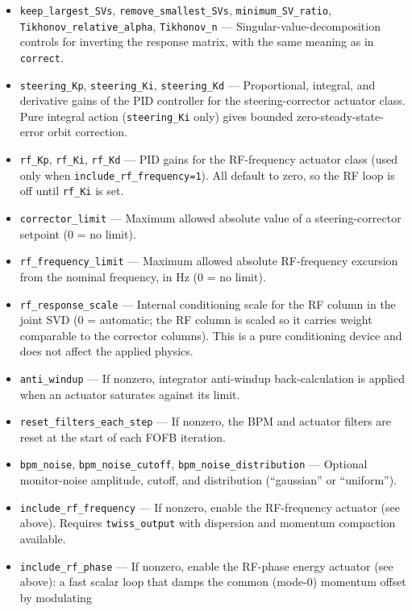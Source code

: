\documentclass[11pt]{article}
\begin{document}
\begin{itemize}
  \verb|correct|.  They are ignored when the default analytic response matrix is used.
\item \verb|keep_largest_SVs|, \verb|remove_smallest_SVs|, \verb|minimum_SV_ratio|,
  \verb|Tikhonov_relative_alpha|, \verb|Tikhonov_n| --- Singular-value-decomposition
  controls for inverting the response matrix, with the same meaning as in \verb|correct|.
\item \verb|steering_Kp|, \verb|steering_Ki|, \verb|steering_Kd| --- Proportional,
  integral, and derivative gains of the PID controller for the steering-corrector
  actuator class.  Pure integral action (\verb|steering_Ki| only) gives bounded
  zero-steady-state-error orbit correction.
\item \verb|rf_Kp|, \verb|rf_Ki|, \verb|rf_Kd| --- PID gains for the RF-frequency actuator
  class (used only when \verb|include_rf_frequency=1|).  All default to zero, so the RF
  loop is off until \verb|rf_Ki| is set.
\item \verb|corrector_limit| --- Maximum allowed absolute value of a steering-corrector
  setpoint (0 = no limit).
\item \verb|rf_frequency_limit| --- Maximum allowed absolute RF-frequency excursion from
  the nominal frequency, in Hz (0 = no limit).
\item \verb|rf_response_scale| --- Internal conditioning scale for the RF column in the
  joint SVD (0 = automatic; the RF column is scaled so it carries weight comparable to the
  corrector columns).  This is a pure conditioning device and does not affect the applied
  physics.
\item \verb|anti_windup| --- If nonzero, integrator anti-windup back-calculation is
  applied when an actuator saturates against its limit.
\item \verb|reset_filters_each_step| --- If nonzero, the BPM and actuator filters are
  reset at the start of each FOFB iteration.
\item \verb|bpm_noise|, \verb|bpm_noise_cutoff|, \verb|bpm_noise_distribution| --- Optional
  monitor-noise amplitude, cutoff, and distribution (``gaussian'' or ``uniform'').
\item \verb|include_rf_frequency| --- If nonzero, enable the RF-frequency actuator (see
  above).  Requires \verb|twiss_output| with dispersion and momentum compaction available.
\item \verb|include_rf_phase| --- If nonzero, enable the RF-phase energy actuator (see
  above): a fast scalar loop that damps the common (mode-0) momentum offset by modulating

\end{itemize}
\end{document}
